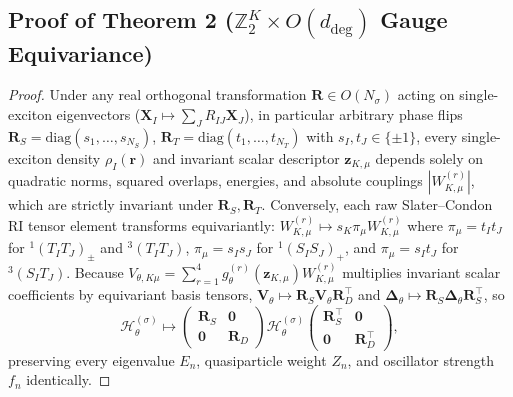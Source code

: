 \documentclass[10pt,a4paper]{article}
\newcommand{\Hlift}{\mathcal{H}_\theta^{(\sigma)}}
\begin{document}
\subsection*{Proof of Theorem 2 ($\mathbb{Z}_2^K \times O(d_{\mathrm{deg}})$ Gauge Equivariance)}
\begin{proof}
Under any real orthogonal transformation $\mathbf{R} \in O(N_\sigma)$ acting on single-exciton eigenvectors ($\mathbf{X}_I \mapsto \sum_J R_{IJ}\mathbf{X}_J$), in particular arbitrary phase flips $\mathbf{R}_S=\mathrm{diag}(s_1,\dots,s_{N_S})$, $\mathbf{R}_T=\mathrm{diag}(t_1,\dots,t_{N_T})$ with $s_I, t_J \in \{\pm 1\}$, every single-exciton density $\rho_I(\mathbf{r})$ and invariant scalar descriptor $\mathbf{z}_{K,\mu}$ depends solely on quadratic norms, squared overlaps, energies, and absolute couplings $|W_{K,\mu}^{(r)}|$, which are strictly invariant under $\mathbf{R}_S,\mathbf{R}_T$. Conversely, each raw Slater--Condon RI tensor element transforms equivariantly: $W_{K,\mu}^{(r)} \mapsto s_K \pi_\mu W_{K,\mu}^{(r)}$ where $\pi_\mu = t_I t_J$ for $^1(T_I T_J)_\pm$ and $^3(T_I T_J)$, $\pi_\mu = s_I s_J$ for $^1(S_I S_J)_+$, and $\pi_\mu = s_I t_J$ for $^3(S_I T_J)$. Because $V_{\theta,K\mu} = \sum_{r=1}^4 g_\theta^{(r)}(\mathbf{z}_{K,\mu}) W_{K,\mu}^{(r)}$ multiplies invariant scalar coefficients by equivariant basis tensors, $\mathbf{V}_\theta \mapsto \mathbf{R}_S \mathbf{V}_\theta \mathbf{R}_D^\top$ and $\boldsymbol{\Delta}_\theta \mapsto \mathbf{R}_S \boldsymbol{\Delta}_\theta \mathbf{R}_S^\top$, so
\begin{equation}
\Hlift \mapsto \begin{pmatrix}\mathbf{R}_S & \mathbf{0} \\ \mathbf{0} & \mathbf{R}_D\end{pmatrix} \Hlift \begin{pmatrix}\mathbf{R}_S^\top & \mathbf{0} \\ \mathbf{0} & \mathbf{R}_D^\top\end{pmatrix},
\end{equation}
preserving every eigenvalue $E_n$, quasiparticle weight $Z_n$, and oscillator strength $f_n$ identically.
\end{proof}
\end{document}
